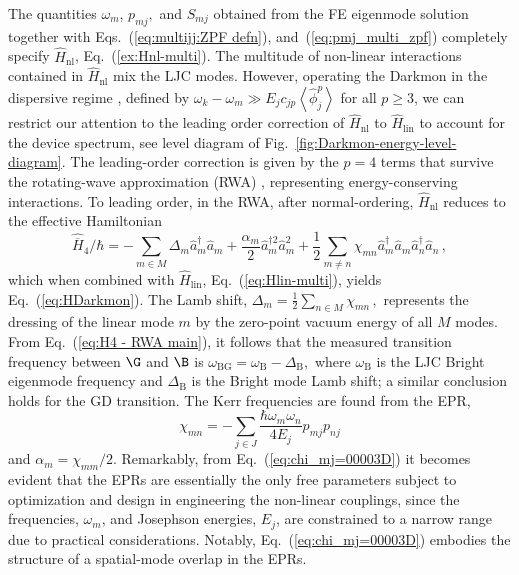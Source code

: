 The quantities $\omega_{m}$, $p_{mj},$ and $S_{mj}$ obtained from
the FE eigenmode solution together with Eqs.~(\ref{eq:multijj:ZPF defn}),
and~(\ref{eq:pmj_multi_zpf}) completely specify $\hat{H}_{\mathrm{nl}}$,
Eq.~(\ref{ex:Hnl-multi}). The multitude of non-linear interactions
contained in $\hat{H}_{\mathrm{nl}}$ mix the LJC modes. However,
operating the Darkmon in the dispersive regime \citep{Blais2004,Koch2007},
defined by $\omega_{k}-\omega_{m}\gg E_{j}c_{jp}\left<\hat{\phi}_{j}^{p}\right>$
for all $p\geq3$, we can restrict our attention to the leading order
correction of $\hat{H}_{\mathrm{nl}}$ to $\hat{H}_{\mathrm{lin}}$
to account for the device spectrum, see level diagram of Fig.~\ref{fig:Darkmon-energy-level-diagram}.
The leading-order correction is given by the $p=4$ terms that survive
the rotating-wave approximation (RWA) \citep{Carmichael2008-Book2,Gardiner2004},
representing energy-conserving interactions. To leading order, in
the RWA, after normal-ordering, $\hat{H}_{\mathrm{nl}}$ reduces to
the effective Hamiltonian 
\begin{equation}
\hat{\overline{H}}_{4}/\hbar=-\sum_{m\in M}\Delta_{m}\hat{a}_{m}^{\dagger}\hat{a}_{m}+\frac{\alpha_{m}}{2}\hat{a}_{m}^{\dagger2}\hat{a}_{m}^{2}+\frac{1}{2}\sum_{m\neq n}\chi_{mn}\hat{a}_{m}^{\dagger}\hat{a}_{m}\hat{a}_{n}^{\dagger}\hat{a}_{n}\,,\label{eq:H4 - RWA main}
\end{equation}
which when combined with $\hat{H}_{\mathrm{lin}}$, Eq.~(\ref{eq:Hlin-multi}),
yields Eq.~(\ref{eq:HDarkmon}). The Lamb shift, $\Delta_{m}=\frac{1}{2}\sum_{n\in M}\chi_{mn}\,,$
represents the dressing of the linear mode $m$ by the zero-point
vacuum energy of all $M$ modes. From Eq.~(\ref{eq:H4 - RWA main}),
it follows that the measured transition frequency between $\G$ and
$\B$ is $\omega_{\mathrm{BG}}=\omega_{\mathrm{B}}-\Delta_{\mathrm{B}},$
where $\omega_{\mathrm{B}}$ is the LJC Bright eigenmode frequency
and $\Delta_{\mathrm{B}}$ is the Bright mode Lamb shift; a similar
conclusion holds for the GD transition. The Kerr frequencies are found
from the EPR,
\begin{equation}
\chi_{mn}=-\sum_{j\in J}\frac{\hbar\omega_{m}\omega_{n}}{4E_{j}}p_{mj}p_{nj}\label{eq:chi_mj=00003D}
\end{equation}
and $\alpha_{m}=\chi_{mm}/2$. Remarkably, from Eq.~(\ref{eq:chi_mj=00003D})
it becomes evident that the EPRs are essentially the only free parameters
subject to optimization and design in engineering the non-linear couplings,
since the frequencies, $\omega_{m}$, and Josephson energies, $E_{j}$,
are constrained to a narrow range due to practical considerations.
Notably, Eq.~(\ref{eq:chi_mj=00003D}) embodies the structure of
a spatial-mode overlap in the EPRs. 



